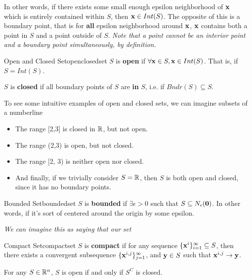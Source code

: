 In other words, if there exists some small enough epsilon neighborhood of $\mathbf{x}$ 
which is entirely contained within $S$, then $\mathbf{x} \in Int(S)$. The opposite
of this is a boundary point, that is
for \textbf{all} epsilon neighborhood around $\mathbf{x}$, $\mathbf{x}$ contains both a point
in $S$ and a point outside of $S$. 
\textit{Note that a point cannot be an interior point
and a boundary point simultaneously, by definition.}

\begin{defn}{Open and Closed Set}{openclosedset}
$S$ is \textbf{open} if $\forall \mathbf{x} \in S, \mathbf{x} \in Int(S)$.
That is, if $S = Int(S)$. 

\bigskip
$S$ is \textbf{closed} if all boundary points of $S$ are \textbf{in} $S$,
i.e. if $Bndr(S) \subseteq S$. 
\end{defn}

To see some intuitive examples of open and closed sets, we can imagine subsets of
a numberline
\begin{itemize}
\item The range [2,3] is closed in $\mathbb{R}$, but not open.
\item The range (2,3) is open, but not closed.
\item The range [2, 3) is neither open nor closed.
\item And finally, if we trivially consider $S = \mathbb{R}$, then $S$ is both
	open and closed, since it has no boundary points.
\end{itemize}

\begin{defn}{Bounded Set}{boundedset}
$S$ is \textbf{bounded} if $\exists \epsilon > 0$ such that 
$S \subseteq N_{\epsilon} ( \mathbf{0} )$.
In other words, if it's sort of centered around the origin by some epsilon.

\textit{We can imagine this as saying that our set }
\end{defn}

\begin{defn}{Compact Set}{compactset}
$S$ is \textbf{compact} if for any sequence 
$\{ \mathbf{x}^i \}_{i=1}^{\infty} \subseteq S$, then there exists a convergent 
subsequence $\{\mathbf{x}^{i,j}\}_{j=1}^{\infty}$, and $\mathbf{y} \in S$ such that
$\mathbf{x}^{i,j} \rightarrow \mathbf{y}$.
\end{defn}

\begin{prop}{}{}
For any $S \in \mathbb{R}^n$, $S$ is open if and only if $S^C$ is closed.
\end{prop}

